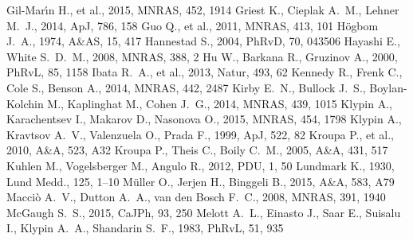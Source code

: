 \documentclass[a4wide,12pt]{book}
\begin{document}
\begin{thebibliography}{}
 Gil-Mar{\'{\i}}n H., et al., 2015, MNRAS, 
452, 1914  
 Griest K., Cieplak A.~M., Lehner M.~J., 2014, ApJ, 786, 158
Guo Q., et al., 2011, MNRAS, 413, 101 
 H{\"o}gbom J.~A., 1974, A\&AS, 15, 417  
Hannestad S., 2004, PhRvD, 70, 043506 
 Hayashi E., White S.~D.~M., 2008, MNRAS, 388, 2 
 Hu W., Barkana R., Gruzinov A., 2000, PhRvL, 85, 1158 
Ibata R.~A., et al., 2013, Natur, 493, 62
 Kennedy R., Frenk C., Cole S., Benson A., 
2014, MNRAS, 442, 2487 
Kirby E.~N., Bullock J.~S., Boylan-Kolchin M., Kaplinghat M., Cohen J.~G., 
2014, MNRAS, 439, 1015  
Klypin A., Karachentsev I., Makarov D., Nasonova O., 2015, MNRAS, 454, 1798 
Klypin A., Kravtsov A.~V., Valenzuela O., Prada F., 1999, ApJ, 522, 82 
 Kroupa P., et al., 2010, A\&A, 523, A32 
 Kroupa P., Theis C., Boily C.~M., 2005, A\&A, 431, 517 
 Kuhlen M., Vogelsberger M., Angulo R., 2012, PDU, 1, 50
Lundmark K., 1930, Lund Medd., 125, 1–10
 M{\"u}ller O., Jerjen H., Binggeli B., 2015, A\&A, 583, A79 
 Macci{\`o} A.~V., Dutton A.~A., van den Bosch F.~C., 2008, MNRAS, 391, 1940 
McGaugh S.~S., 2015, CaJPh, 93, 250 
Melott A.~L., Einasto J., Saar E., Suisalu I., Klypin A.~A., Shandarin 
S.~F., 1983, PhRvL, 51, 935 

\end{thebibliography}
\end{document}
